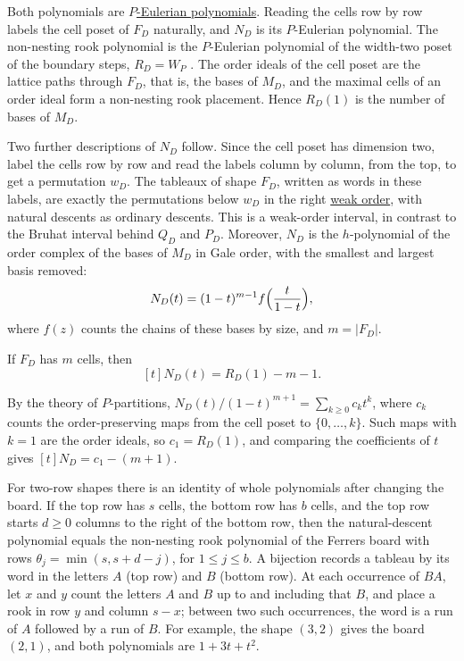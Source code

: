 Both polynomials are \hyperref[pEulerianPolynomial]{$P$-Eulerian
polynomials}.  Reading the cells row by row labels the cell poset
of $F_D$ naturally, and $N_D$ is its $P$-Eulerian polynomial.  The
non-nesting rook polynomial is the $P$-Eulerian polynomial of the width-two
poset of the boundary steps, $R_D=W_P$ \cite{AlexanderssonJal2024x}.  The
order ideals of the cell poset are the lattice paths through $F_D$, that is,
the bases of $M_D$, and the maximal cells of an order ideal form a non-nesting
rook placement.  Hence $R_D(1)$ is the number of bases of $M_D$.

Two further descriptions of $N_D$ follow.  Since the cell poset has dimension
two, label the cells row by row and read the labels column by column, from the
top, to get a permutation $w_D$.  The tableaux of shape $F_D$, written as words
in these labels, are exactly the permutations below $w_D$ in the right
\hyperref[weakOrder]{weak order}, with natural descents as ordinary descents.
This is a weak-order interval, in contrast to the Bruhat interval behind
$Q_D$ and $P_D$.  Moreover, $N_D$ is the $h$-polynomial of the order complex
of the bases of $M_D$ in Gale order, with the smallest and largest basis
removed:
\[
  N_D(t)=(1-t)^{m-1}f\Bigl(\frac{t}{1-t}\Bigr),
\]
where $f(z)$ counts the chains of these bases by size, and $m=|F_D|$.

\begin{proposition}
If $F_D$ has $m$ cells, then
\[
  [t]N_D(t)=R_D(1)-m-1.
\]
\end{proposition}

\begin{proof*}
By the theory of $P$-partitions, $N_D(t)/(1-t)^{m+1}=\sum_{k\geq0}c_kt^k$,
where $c_k$ counts the order-preserving maps from the cell poset to
$\{0,\dotsc,k\}$.  Such maps with $k=1$ are the order ideals, so
$c_1=R_D(1)$, and comparing the coefficients of $t$ gives
$[t]N_D=c_1-(m+1)$.
\end{proof*}

For two-row shapes there is an identity of whole polynomials after changing
the board.  If the top row has $s$ cells, the bottom row has $b$ cells, and the
top row starts $d\geq0$ columns to the right of the bottom row, then the
natural-descent polynomial equals the non-nesting rook polynomial of the
Ferrers board with rows $\theta_j=\min(s,s+d-j)$, for $1\leq j\leq b$.
A bijection records a tableau by its word in the letters $A$ (top row)
and $B$ (bottom row).  At each occurrence of $BA$, let $x$ and $y$ count the
letters $A$ and $B$ up to and including that $B$, and place a rook in row $y$
and column $s-x$; between two such occurrences, the word is a run of $A$
followed by a run of $B$.  For example, the shape $(3,2)$ gives the board $(2,1)$, and both
polynomials are $1+3t+t^2$.

